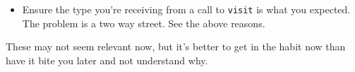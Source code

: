 \documentclass{article}
\newcommand{\code}[1]{\texttt{\textmd{#1}}}
\begin{document}
\begin{itemize}
\begin{itemize}
        you're returning a typed variable you may get inexpicable type errors from \code{Any}. In
        other words, don't return temporaries. For example, this will break if the receiving side
        wants a pointer to the parent class even though there's an available typesafe cast:
        \begin{lstlisting}
          {
            ...
            return std::make_shared<MyChildClass>(...);
          }
        \end{lstlisting}
      \item
        Ensure the type you're receiving from a call to \code{visit} is what you expected. The
        problem is a two way street. See the above reasons.
    \end{itemize}
    These may not seem relevant now, but it's better to get in the habit now than have it bite you
    later and not understand why.
\end{itemize}
\end{document}
